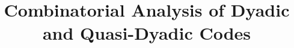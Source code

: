 \documentclass[11pt]{article}
\theoremstyle{plain}
\theoremstyle{plain}
\theoremstyle{definition}
\numberwithin{theo}{section}
\newcounter{ara}
\newcounter{rom}
\begin{document}
\title{Combinatorial Analysis of Dyadic and Quasi-Dyadic Codes}



                    


\end{document}
